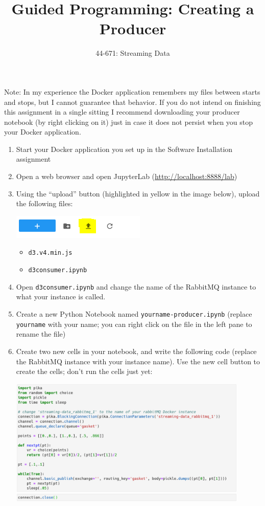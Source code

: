 \documentclass[letterpaper,10pt]{article}
\title{Guided Programming: Creating a Producer}
\author{44-671: Streaming Data}
\date{}
\begin{document}
\maketitle

Note: In my experience the Docker application remembers my files between starts and stops, but I cannot guarantee that behavior.
If you do not intend on finishing this assignment in a single sitting I recommend downloading your producer notebook (by right clicking on it) just in case it does not persist when you stop your Docker application.

\begin{enumerate}
	\item Start your Docker application you set up in the Software Installation assignment
	\item Open a web browser and open JupyterLab (\url{http://localhost:8888/lab})
	\item Using the ``upload'' button (highlighted in yellow in the image below), upload the following files:
		\begin{center}
			\includegraphics{upload-btn.PNG}
		\end{center}
		\begin{itemize}
			\item \texttt{d3.v4.min.js}
			\item \texttt{d3consumer.ipynb}
		\end{itemize}
	\item Open \texttt{d3consumer.ipynb} and change the name of the RabbitMQ instance to what your instance is called.
	\item Create a new Python Notebook named \texttt{yourname-producer.ipynb} (replace \texttt{yourname} with your name; you can right click on the file in the left pane to rename the file)
	\item Create two new cells in your notebook, and write the following code (replace the RabbitMQ instance with your instance name).  Use the new cell button to create the cells; don't run the cells just yet:
		\begin{center}
			\includegraphics[width=0.9\textwidth]{producer-code.PNG}

\end{center}
\end{enumerate}
\end{document}
